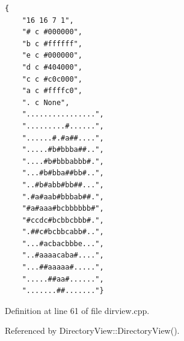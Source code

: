 \footnotesize\begin{verbatim}{
    "16 16 7 1",
    "# c #000000",
    "b c #ffffff",
    "e c #000000",
    "d c #404000",
    "c c #c0c000",
    "a c #ffffc0",
    ". c None",
    "................",
    ".........#......",
    "......#.#a##....",
    ".....#b#bbba##..",
    "....#b#bbbabbb#.",
    "...#b#bba##bb#..",
    "..#b#abb#bb##...",
    ".#a#aab#bbbab##.",
    "#a#aaa#bcbbbbbb#",
    "#ccdc#bcbbcbbb#.",
    ".##c#bcbbcabb#..",
    "...#acbacbbbe...",
    "..#aaaacaba#....",
    "...##aaaaa#.....",
    ".....##aa#......",
    ".......##......."}
\end{verbatim}\normalsize 


Definition at line 61 of file dirview.cpp.

Referenced by Directory\-View::Directory\-View().